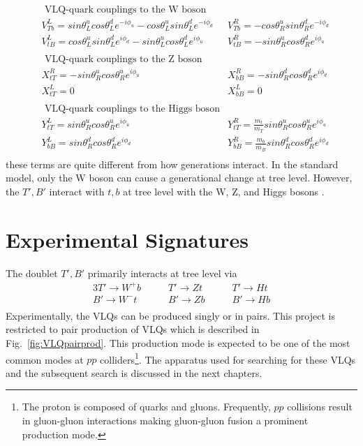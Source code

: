 \begin{align*}
    &\textrm{ VLQ-quark couplings to the W boson} \\
    &V^{L}_{Tb} = sin\theta^{u}_{L}cos\theta^{d}_{L}e^{-i\phi_{u}} - cos\theta^{u}_{L}sin\theta^{d}_{L}e^{-i\phi_{d}} &
    V^{R}_{Tb} = -cos\theta^{u}_{R}sin\theta^{d}_{R}e^{-i\phi_{d}} \\
    &V^{L}_{tB} = cos\theta^{u}_{L}sin\theta^{d}_{L}e^{i\phi_{d}} - sin\theta^{u}_{L}cos\theta^{d}_{L}e^{i\phi_{u}} &
    V^{R}_{tB} = -sin\theta^{u}_{R}cos\theta^{d}_{R}e^{i\phi_{u}} \\
    \\
    &\textrm{ VLQ-quark couplings to the Z boson} \\
    &X^{R}_{tT} = -sin\theta^{u}_{R}cos\theta^{u}_{R}e^{i\phi_{u}} &
    X^{R}_{bB} = -sin\theta^{d}_{R}cos\theta^{d}_{R}e^{i\phi_{d}} \\
    &X^{L}_{tT} = 0 & X^{L}_{bB} = 0 \\
    \\
    &\textrm{ VLQ-quark couplings to the Higgs boson} \\
    &Y^{L}_{tT} = sin\theta^{u}_{R}cos\theta^{u}_{R}e^{i\phi_{u}} &
    Y^{R}_{tT} = \frac{m_{t}}{m_{T}}sin\theta^{u}_{R}cos\theta^{u}_{R}e^{i\phi_{u}} \\
    &Y^{L}_{bB} = sin\theta^{d}_{R}cos\theta^{d}_{R}e^{i\phi_{d}} &
    Y^{R}_{bB} = \frac{m_{b}}{m_{B}}sin\theta^{d}_{R}cos\theta^{d}_{R}e^{i\phi_{d}} \\
\end{align*}
these terms are quite different from how generations interact. In the standard model, only the W boson can cause a generational change at tree level. However, the $T',B'$ interact with $t,b$ at tree level with the W, Z, and Higgs bosons \cite{VLQHandbook}.

\section{Experimental Signatures}

The doublet $T',B'$ primarily interacts at tree level via
\begin{alignat*}{3}
    T'\rightarrow W^{+}b &\qquad T'\rightarrow Zt &\qquad T'\rightarrow Ht \\
    B'\rightarrow W^{-}t &\qquad B'\rightarrow Zb &\qquad B'\rightarrow Hb \\
\end{alignat*}
Experimentally, the VLQs can be produced singly or in pairs. This project is restricted to pair production of VLQs which is described in Fig.~\ref{fig:VLQpairprod}. This production mode is expected to be one of the most common modes at $pp$ colliders\footnote{The proton is composed of quarks and gluons. Frequently, $pp$ collisions result in gluon-gluon interactions making gluon-gluon fusion a prominent production mode.}. The apparatus used for searching for these VLQs and the subsequent search is discussed in the next chapters.

